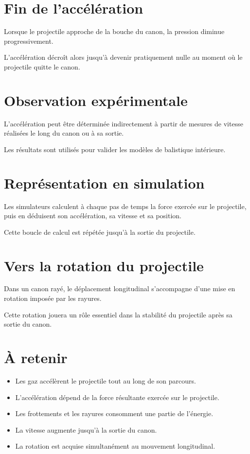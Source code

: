 \section{Fin de l'accélération}

Lorsque le projectile approche de la bouche du canon, la pression diminue
progressivement.

L'accélération décroît alors jusqu'à devenir pratiquement nulle au moment où le
projectile quitte le canon.

\section{Observation expérimentale}

L'accélération peut être déterminée indirectement à partir de mesures de
vitesse réalisées le long du canon ou à sa sortie.

Les résultats sont utilisés pour valider les modèles de balistique intérieure.

\section{Représentation en simulation}

\begin{simulation}

Les simulateurs calculent à chaque pas de temps la force exercée sur le
projectile, puis en déduisent son accélération, sa vitesse et sa position.

Cette boucle de calcul est répétée jusqu'à la sortie du projectile.

\end{simulation}

\section{Vers la rotation du projectile}

Dans un canon rayé, le déplacement longitudinal s'accompagne d'une mise en
rotation imposée par les rayures.

Cette rotation jouera un rôle essentiel dans la stabilité du projectile après
sa sortie du canon.

\section{À retenir}

\begin{aretenir}

\begin{itemize}
    \item Les gaz accélèrent le projectile tout au long de son parcours.
    \item L'accélération dépend de la force résultante exercée sur le projectile.
    \item Les frottements et les rayures consomment une partie de l'énergie.
    \item La vitesse augmente jusqu'à la sortie du canon.
    \item La rotation est acquise simultanément au mouvement longitudinal.
\end{itemize}

\end{aretenir}
